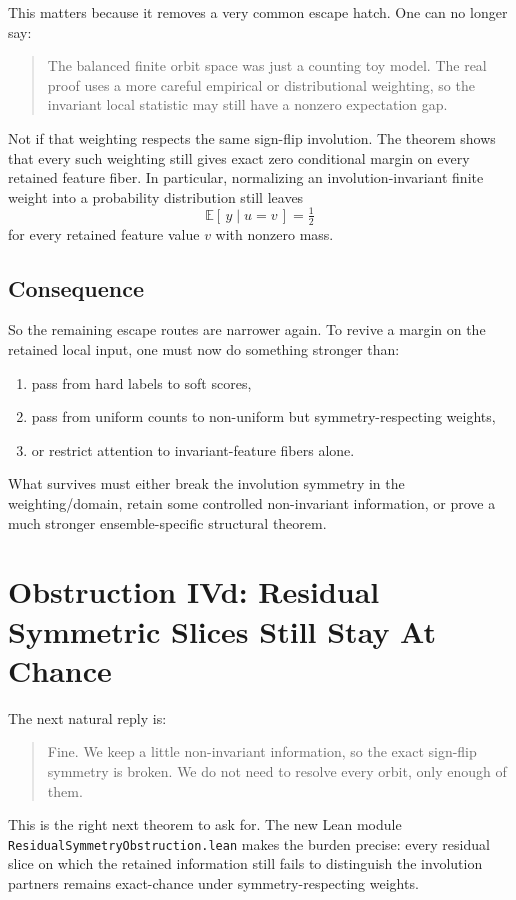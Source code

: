 \documentclass[11pt]{article}
\theoremstyle{remark}
\begin{document}
This matters because it removes a very common escape hatch.  One can no longer say:
\begin{quote}
The balanced finite orbit space was just a counting toy model.  The real proof uses a more
careful empirical or distributional weighting, so the invariant local statistic may still have a
nonzero expectation gap.
\end{quote}

Not if that weighting respects the same sign-flip involution.  The theorem shows that every such
weighting still gives exact zero conditional margin on every retained feature fiber.  In
particular, normalizing an involution-invariant finite weight into a probability distribution
still leaves
\[
  \mathbb{E}[\,y \mid u=v\,] = \tfrac12
\]
for every retained feature value \(v\) with nonzero mass.

\subsection{Consequence}

So the remaining escape routes are narrower again.  To revive a margin on the retained local
input, one must now do something stronger than:
\begin{enumerate}[leftmargin=1.5em]
  \item pass from hard labels to soft scores,
  \item pass from uniform counts to non-uniform but symmetry-respecting weights,
  \item or restrict attention to invariant-feature fibers alone.
\end{enumerate}

What survives must either break the involution symmetry in the weighting/domain, retain some
controlled non-invariant information, or prove a much stronger ensemble-specific structural
theorem.

\section{Obstruction IVd: Residual Symmetric Slices Still Stay At Chance}

The next natural reply is:
\begin{quote}
Fine.  We keep a little non-invariant information, so the exact sign-flip symmetry is broken.  We
do not need to resolve every orbit, only enough of them.
\end{quote}

This is the right next theorem to ask for.  The new Lean module
\texttt{ResidualSymmetryObstruction.lean} makes the burden precise: every residual slice on which
the retained information still fails to distinguish the involution partners remains exact-chance
under symmetry-respecting weights.
\end{document}
